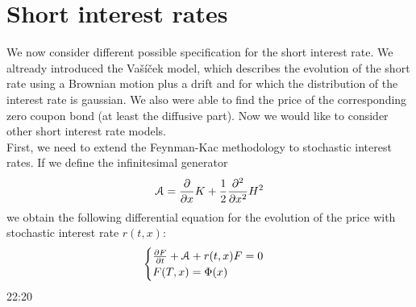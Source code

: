 \section{Short interest rates}
We now consider different possible specification for the short interest rate. We altready introduced the Vašíček model, which describes the evolution of the short rate using a Brownian motion plus a drift and for which the distribution of the interest rate is gaussian. We also were able to find the price of the corresponding zero coupon bond (at least the diffusive part). Now we would like to consider other short interest rate models. \\
First, we need to extend the Feynman-Kac methodology to stochastic interest rates. If we define the infinitesimal generator
\begin{equation*}
    \mathcal{A} = \pdv{}{x}K + \frac{1}{2}\pdv[2]{}{x}H^2
\end{equation*}
we obtain the following differential equation for the evolution of the price with stochastic interest rate $r(t,x)$:
\begin{equation}
    \begin{cases}
        \pdv{F}{t} + \mathcal{A} + r(t,x)F = 0 \\
        F(T,x) = \Phi(x)
    \end{cases}
\end{equation}
22:20
